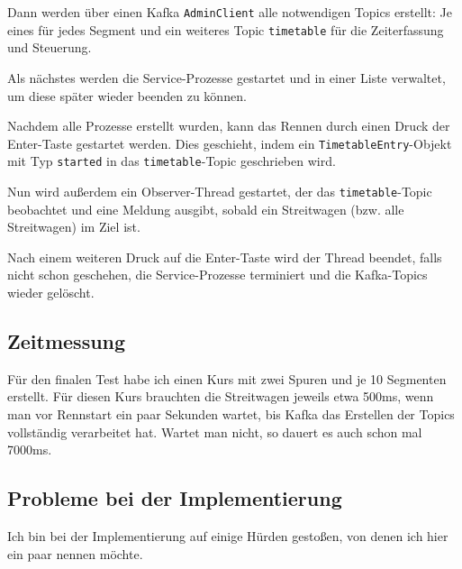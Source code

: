 \documentclass[12pt]{article}
\begin{document}
Dann werden über einen Kafka \texttt{AdminClient} alle notwendigen Topics erstellt: Je eines für jedes Segment und ein weiteres Topic \texttt{timetable} für die Zeiterfassung und Steuerung.

Als nächstes werden die Service-Prozesse gestartet und in einer Liste verwaltet, um diese später wieder beenden zu können.

Nachdem alle Prozesse erstellt wurden, kann das Rennen durch einen Druck der Enter-Taste gestartet werden.
Dies geschieht, indem ein \texttt{TimetableEntry}-Objekt mit Typ \texttt{started} in das \texttt{timetable}-Topic geschrieben wird.

Nun wird außerdem ein Observer-Thread gestartet, der das \texttt{timetable}-Topic beobachtet und eine Meldung ausgibt, sobald ein Streitwagen (bzw. alle Streitwagen) im Ziel ist.

Nach einem weiteren Druck auf die Enter-Taste wird der Thread beendet, falls nicht schon geschehen, die Service-Prozesse terminiert und die Kafka-Topics wieder gelöscht.

\subsection*{Zeitmessung}
Für den finalen Test habe ich einen Kurs mit zwei Spuren und je 10 Segmenten erstellt. 
Für diesen Kurs brauchten die Streitwagen jeweils etwa 500ms, wenn man vor Rennstart ein paar Sekunden wartet, bis Kafka das Erstellen der Topics vollständig verarbeitet hat. 
Wartet man nicht, so dauert es auch schon mal 7000ms.

\subsection*{Probleme bei der Implementierung}
Ich bin bei der Implementierung auf einige Hürden gestoßen, von denen ich hier ein paar nennen möchte.
\end{document}
